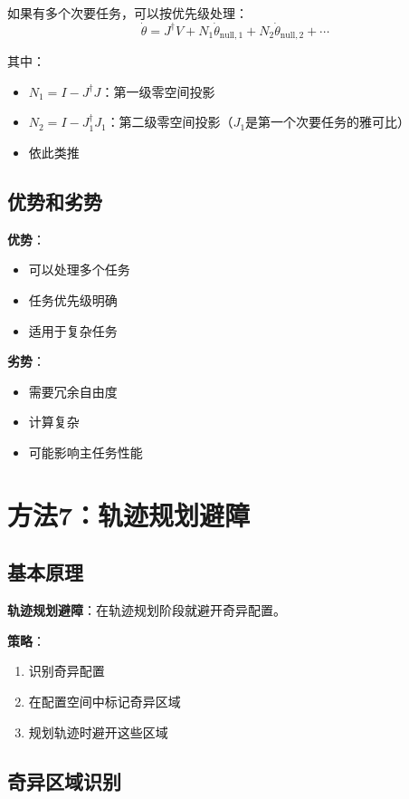 \documentclass[12pt,a4paper]{article}
\begin{document}
如果有多个次要任务，可以按优先级处理：
\begin{equation}
\dot{\theta} = J^{\dagger}V + N_1 \dot{\theta}_{\text{null},1} + N_2 \dot{\theta}_{\text{null},2} + \cdots
\end{equation}

其中：
\begin{itemize}
\item $N_1 = I - J^{\dagger}J$：第一级零空间投影
\item $N_2 = I - J_1^{\dagger}J_1$：第二级零空间投影（$J_1$是第一个次要任务的雅可比）
\item 依此类推
\end{itemize}

\subsection{优势和劣势}

\textbf{优势}：
\begin{itemize}
\item 可以处理多个任务
\item 任务优先级明确
\item 适用于复杂任务
\end{itemize}

\textbf{劣势}：
\begin{itemize}
\item 需要冗余自由度
\item 计算复杂
\item 可能影响主任务性能
\end{itemize}

\section{方法7：轨迹规划避障}

\subsection{基本原理}

\textbf{轨迹规划避障}：在轨迹规划阶段就避开奇异配置。

\textbf{策略}：
\begin{enumerate}
\item 识别奇异配置
\item 在配置空间中标记奇异区域
\item 规划轨迹时避开这些区域
\end{enumerate}

\subsection{奇异区域识别}
\end{document}
